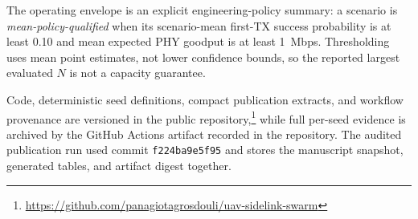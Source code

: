 The operating envelope is an explicit engineering-policy summary: a scenario is \emph{mean-policy-qualified} when its scenario-mean first-TX success probability is at least 0.10 and mean expected PHY goodput is at least 1~Mbps. Thresholding uses mean point estimates, not lower confidence bounds, so the reported largest evaluated $N$ is not a capacity guarantee.

Code, deterministic seed definitions, compact publication extracts, and workflow provenance are versioned in the public repository,\footnote{\url{https://github.com/panagiotagrosdouli/uav-sidelink-swarm}} while full per-seed evidence is archived by the GitHub Actions artifact recorded in the repository. The audited publication run used commit \texttt{f224ba9e5f95} and stores the manuscript snapshot, generated tables, and artifact digest together.
